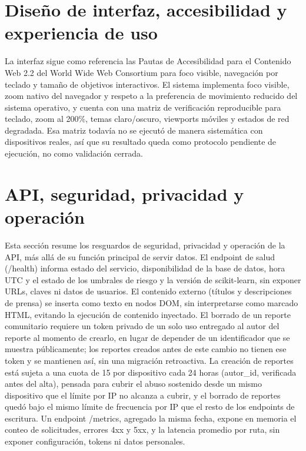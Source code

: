 \section{Diseño de interfaz, accesibilidad y experiencia de uso}

La interfaz sigue como referencia las Pautas de Accesibilidad para el
Contenido Web 2.2 del World Wide Web Consortium \citeyearpar{wcag2024} para foco visible, navegación por teclado y
tamaño de objetivos interactivos. El sistema implementa foco visible,
zoom nativo del navegador y respeto a la preferencia de movimiento
reducido del sistema operativo, y cuenta con una matriz de verificación
reproducible para teclado, zoom al 200\%, temas claro/oscuro, viewports
móviles y estados de red degradada. Esa matriz todavía no se ejecutó de
manera sistemática con dispositivos reales, así que su resultado queda
como protocolo pendiente de ejecución, no como validación cerrada.

\section{API, seguridad, privacidad y operación}

Esta sección resume los resguardos de seguridad, privacidad y operación
de la API, más allá de su función principal de servir datos. El endpoint
de salud (/health) informa estado del servicio, disponibilidad de la
base de datos, hora UTC y el estado de los umbrales de riesgo y la
versión de scikit-learn, sin exponer URLs, claves ni datos de usuarios.
El contenido externo (títulos y descripciones de prensa) se inserta como
texto en nodos DOM, sin interpretarse como marcado HTML, evitando la
ejecución de contenido inyectado. El borrado de un reporte comunitario
requiere un token privado de un solo uso entregado al autor del reporte
al momento de crearlo, en lugar de depender de un identificador que se
muestra públicamente; los reportes creados antes de este cambio no
tienen ese token y se mantienen así, sin una migración retroactiva. La
creación de reportes está sujeta a una cuota de 15 por dispositivo cada
24 horas (autor\_id, verificada antes del alta), pensada para cubrir el
abuso sostenido desde un mismo dispositivo que el límite por IP no
alcanza a cubrir, y el borrado de reportes quedó bajo el mismo límite de
frecuencia por IP que el resto de los endpoints de escritura. Un
endpoint /metrics, agregado la misma fecha, expone en memoria el conteo
de solicitudes, errores 4xx y 5xx, y la latencia promedio por ruta, sin
exponer configuración, tokens ni datos personales.

